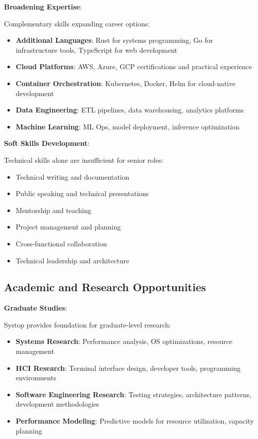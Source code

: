 \documentclass[12pt,a4paper,oneside]{report}
\begin{document}
\textbf{Broadening Expertise}:

Complementary skills expanding career options:

\begin{itemize}
    \item \textbf{Additional Languages}: Rust for systems programming, Go for infrastructure tools, TypeScript for web development
    \item \textbf{Cloud Platforms}: AWS, Azure, GCP certifications and practical experience
    \item \textbf{Container Orchestration}: Kubernetes, Docker, Helm for cloud-native development
    \item \textbf{Data Engineering}: ETL pipelines, data warehousing, analytics platforms
    \item \textbf{Machine Learning}: ML Ops, model deployment, inference optimization
\end{itemize}

\textbf{Soft Skills Development}:

Technical skills alone are insufficient for senior roles:

\begin{itemize}
    \item Technical writing and documentation
    \item Public speaking and technical presentations
    \item Mentorship and teaching
    \item Project management and planning
    \item Cross-functional collaboration
    \item Technical leadership and architecture
\end{itemize}

\subsection{Academic and Research Opportunities}

\textbf{Graduate Studies}:

Systop provides foundation for graduate-level research:

\begin{itemize}
    \item \textbf{Systems Research}: Performance analysis, OS optimizations, resource management
    \item \textbf{HCI Research}: Terminal interface design, developer tools, programming environments
    \item \textbf{Software Engineering Research}: Testing strategies, architecture patterns, development methodologies
    \item \textbf{Performance Modeling}: Predictive models for resource utilization, capacity planning
\end{itemize}
\end{document}
